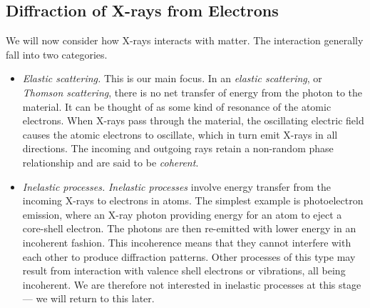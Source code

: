 \documentclass{article}
\theoremstyle{plain}\theoremheaderfont{\normalfont\itshape}\theorembodyfont{\rmfamily}\theoremseparator{.}\newtheorem*{rem}{Remark}\newtheorem*{ex}{Example}\newtheorem*{proof}{Proof}\newtheorem*{altp}{Alternative proof}
\theoremstyle{plain}\theoremheaderfont{\normalfont\bfseries}\theorembodyfont{\rmfamily}\theoremseparator{.}\newtheorem{thm}{Theorem}[section]\newtheorem{lem}[thm]{Lemma}\newtheorem{prop}[thm]{Proposition}\newtheorem*{cor}{Corollary}\newtheorem{defn}[thm]{Definition}\newtheorem{clm}[thm]{Claim}\newtheorem{clminproof}{Claim}\newtheorem*{law}{Law}\newtheorem{pos}[thm]{Postulate}
\theoremstyle{break}\theoremheaderfont{\normalfont\itshape}\theorembodyfont{\rmfamily}\theoremseparator{.\medskip}\newtheorem*{proofskip}{Proof}\newtheorem*{exs}{Examples}\newtheorem*{rems}{Remarks}
\theoremstyle{break}\theoremheaderfont{\normalfont\bfseries}\theorembodyfont{\rmfamily}\theoremseparator{.\medskip}\newtheorem{lemskip}[thm]{Lemma}\newtheorem{defnskip}[thm]{Definition}\newtheorem{propskip}[thm]{Proposition}\newtheorem{thmskip}[thm]{Theorem}
\numberwithin{equation}{section}
\begin{document}
    \subsection{Diffraction of X-rays from Electrons}
    We will now consider how X-rays interacts with matter. The interaction generally fall into two categories.
    \begin{itemize}[topsep=0pt]
        \item \textit{Elastic scattering.} This is our main focus. In an \textit{elastic scattering}, or \textit{Thomson scattering}, there is no net transfer of energy from the photon to the material. It can be thought of as some kind of resonance of the atomic electrons. When X-rays pass through the material, the oscillating electric field causes the atomic electrons to oscillate, which in turn emit X-rays in all directions. The incoming and outgoing rays retain a non-random phase relationship and are said to be \textit{coherent}.
        \item \textit{Inelastic processes.} \textit{Inelastic processes} involve energy transfer from the incoming X-rays to electrons in atoms. The simplest example is photoelectron emission, where an X-ray photon providing energy for an atom to eject a core-shell electron. The photons are then re-emitted with lower energy in an incoherent fashion. This incoherence means that they cannot interfere with each other to produce diffraction patterns. Other processes of this type may result from interaction with valence shell electrons or vibrations, all being incoherent. We are therefore not interested in inelastic processes at this stage --- we will return to this later.
    \end{itemize}
\end{document}
